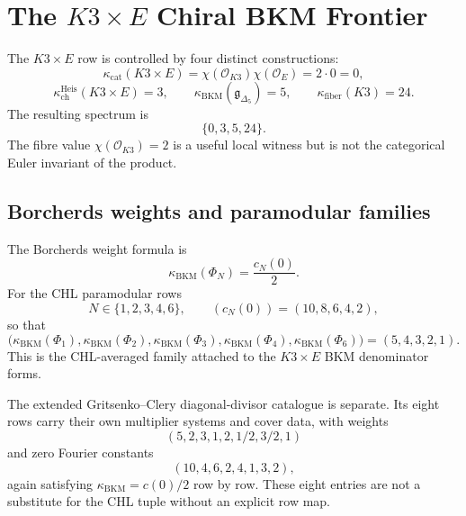 \providecommand{\kBKM}{\kappa_{\mathrm{BKM}}}
\providecommand{\kch}{\kappa_{\mathrm{ch}}}
\providecommand{\kcat}{\kappa_{\mathrm{cat}}}
\providecommand{\kfib}{\kappa_{\mathrm{fiber}}}
\providecommand{\Sp}{\mathrm{Sp}}
\providecommand{\ZZ}{\mathbb{Z}}
\providecommand{\cA}{\mathcal{A}}
\providecommand{\cE}{\mathcal{E}}
\providecommand{\cO}{\mathcal{O}}
\providecommand{\Obs}{\mathrm{Obs}}
\providecommand{\hCS}{\mathrm{hCS}}
\providecommand{\CE}{\mathrm{CE}}
\providecommand{\Ch}{\mathrm{Ch}}
\providecommand{\Dolb}{\mathrm{Dolb}}
\providecommand{\chir}{\mathrm{chir}}
\providecommand{\CoHA}{\mathrm{CoHA}}
\providecommand{\Yplus}{Y^+_{\epsilon_1,\epsilon_2}}
\providecommand{\fg}{\mathfrak{g}}
\providecommand{\bH}{\mathbf{H}}
\providecommand{\CYcat}{\mathrm{CY}\text{-cat}}
\providecommand{\ChirAlg}{\mathrm{ChirAlg}}
\providecommand{\Phifun}{\Phi}

\section{The $K3\times E$ Chiral BKM Frontier}
\label{wn:sec:k3e-chiral-bkm-frontier}

The $K3\times E$ row is controlled by four distinct constructions:
\[
  \kcat(K3\times E)
  =\chi(\cO_{K3})\chi(\cO_E)
  =2\cdot 0
  =0,
\]
\[
  \kch^{\mathrm{Heis}}(K3\times E)=3,\qquad
  \kBKM(\mathfrak g_{\Delta_5})=5,\qquad
  \kfib(K3)=24.
\]
The resulting spectrum is
\[
  \{0,3,5,24\}.
\]
The fibre value $\chi(\cO_{K3})=2$ is a useful local witness but is not
the categorical Euler invariant of the product.

\subsection{Borcherds weights and paramodular families}
\label{wn:subsec:k3e-borcherds-weights}

The Borcherds weight formula is
\[
  \kBKM(\Phi_N)=\frac{c_N(0)}{2}.
\]
For the CHL paramodular rows
\[
  N\in\{1,2,3,4,6\},
  \qquad
  (c_N(0))=(10,8,6,4,2),
\]
so that
\[
  \bigl(\kBKM(\Phi_1),\kBKM(\Phi_2),\kBKM(\Phi_3),
  \kBKM(\Phi_4),\kBKM(\Phi_6)\bigr)
  =(5,4,3,2,1).
\]
This is the CHL-averaged family attached to the $K3\times E$ BKM
denominator forms.

The extended Gritsenko--Clery diagonal-divisor catalogue is separate.
Its eight rows carry their own multiplier systems and cover data, with
weights
\[
  (5,2,3,1,2,1/2,3/2,1)
\]
and zero Fourier constants
\[
  (10,4,6,2,4,1,3,2),
\]
again satisfying $\kBKM=c(0)/2$ row by row.  These eight entries are
not a substitute for the CHL tuple without an explicit row map.

